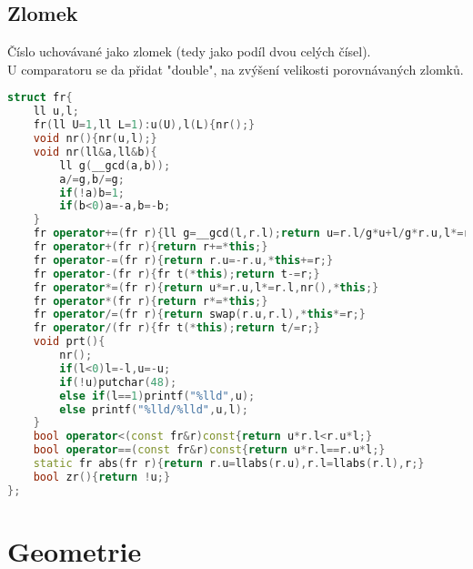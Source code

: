 \documentclass[11pt]{article}
\begin{document}
\subsection{Zlomek}
Číslo uchovávané jako zlomek (tedy jako podíl dvou celých čísel).
\\U comparatoru se da přidat "double", na zvýšení velikosti porovnávaných zlomků.
\begin{lstlisting}[language=C++]
struct fr{
    ll u,l;
    fr(ll U=1,ll L=1):u(U),l(L){nr();}
    void nr(){nr(u,l);}
    void nr(ll&a,ll&b){
        ll g(__gcd(a,b));
        a/=g,b/=g;
        if(!a)b=1;
        if(b<0)a=-a,b=-b;
    }
    fr operator+=(fr r){ll g=__gcd(l,r.l);return u=r.l/g*u+l/g*r.u,l*=r.l/g,nr(),*this;}
    fr operator+(fr r){return r+=*this;}
    fr operator-=(fr r){return r.u=-r.u,*this+=r;}
    fr operator-(fr r){fr t(*this);return t-=r;}
    fr operator*=(fr r){return u*=r.u,l*=r.l,nr(),*this;}
    fr operator*(fr r){return r*=*this;}
    fr operator/=(fr r){return swap(r.u,r.l),*this*=r;}
    fr operator/(fr r){fr t(*this);return t/=r;}
    void prt(){
        nr();
        if(l<0)l=-l,u=-u;
        if(!u)putchar(48);
        else if(l==1)printf("%lld",u);
        else printf("%lld/%lld",u,l);
    }
    bool operator<(const fr&r)const{return u*r.l<r.u*l;}
    bool operator==(const fr&r)const{return u*r.l==r.u*l;}
    static fr abs(fr r){return r.u=llabs(r.u),r.l=llabs(r.l),r;}
    bool zr(){return !u;}
};
\end{lstlisting}
\newpage\section{Geometrie}
\end{document}
